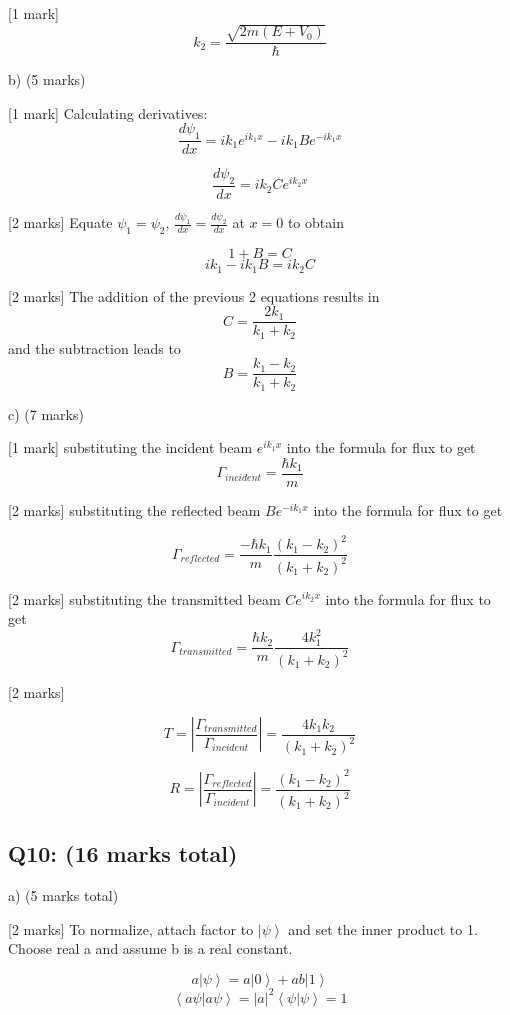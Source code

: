 \documentclass[a4paper,11pt]{article}
\begin{document}
[1 mark] \[k_{2} = \frac{\sqrt{2m(E+V_0)}}{\hbar} \]

b) (5 marks)

[1 mark] Calculating derivatives:
\[ \frac{d\psi_1}{dx} = ik_{1}e^{ik_{1}x} - ik_{1}Be^{-ik_{1}x} \]

\[ \frac{d\psi_2}{dx} = ik_{2}Ce^{ik_{2}x} \]

[2 marks] Equate \( \psi_{1} = \psi_{2} \), \( \frac{d\psi_1}{dx} = \frac{d\psi_2}{dx} \) at \(x = 0\) to obtain

\[1 + B = C\]
\[ik_{1} - ik_{1}B = ik_{2}C\]

[2 marks] The addition of the previous 2 equations results in \[ C = \frac{2k_{1}}{k_{1}+k_{2}} \] and the subtraction leads to  \[ B = \frac{k_{1}-k_{2}}{k_{1}+k_{2}} \]

c) (7 marks)

[1 mark] substituting the incident beam \( e^{ik_{1}x} \) into the formula for flux to get \[\Gamma_{incident} = \frac{\hbar k_{1}}{m} \]

[2 marks] substituting the reflected beam \( Be^{-ik_{1}x} \) into the formula for flux to get 

\[ 
\Gamma_{reflected} = \frac{-\hbar k_{1}}{m}\frac{\left(k_{1} - k_{2} \right)^{2}}{ \left(k_{1} + k_{2} \right)^{2}} 
\]

[2 marks] substituting the transmitted beam \( Ce^{ik_{2}x} \) into the formula for flux to get \[\Gamma_{transmitted} = \frac{\hbar k_{2}}{m} \frac{4k_{1}^{2}}{ \left(k_{1} + k_{2} \right)^{2}} \]

[2 marks]

\[ T = \left|\frac{\Gamma_{transmitted}}{\Gamma_{incident}} \right| = \frac{4k_{1}k_{2}}{(k_{1}+k_{2})^{2}} \]

\[R = \left|\frac{\Gamma_{reflected}}{\Gamma_{incident}} \right| = \frac{(k_{1}-k_{2})^{2}}{(k_{1}+k_{2})^{2}} \]

\subsection*{Q10: (16 marks total) }

a) (5 marks total)

[2 marks] To normalize, attach factor to \( \left| \psi \right> \) and set the inner product to 1. Choose real a and assume b is a real constant. 

\[ a \left| \psi \right> = a\left| 0 \right> + ab \left| 1 \right> \]
\[ \left< a\psi | a\psi \right> = |a|^2 \left< \psi | \psi \right> = 1 \]
\end{document}
